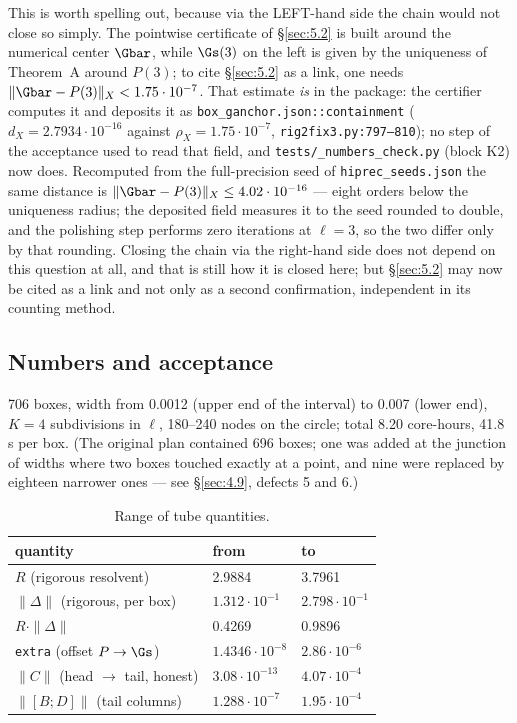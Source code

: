 This is worth spelling out, because via the LEFT-hand side the chain would
not close so simply. The pointwise certificate of \S\ref{sec:5.2} is built around the
numerical center $\Gbar$, while $\Gs(3)$ on the left is given by the uniqueness
of Theorem~A around $P(3)$; to cite \S\ref{sec:5.2} as a link, one needs
$\|\Gbar - P(3)\|_{X} < 1.75\cdot 10^{-7}$. That estimate \emph{is} in the package:
the certifier computes it and deposits it as
\texttt{box\_\allowbreak ganchor.json::\allowbreak containment}
($d_{X} = 2.7934\cdot 10^{-16}$ against $\rho_{X} = 1.75\cdot 10^{-7}$,
\texttt{rig2fix3.py:797--810}); no step of the acceptance used to read that
field, and \texttt{tests/\allowbreak \_\allowbreak numbers\_\allowbreak check.py}
(block K2) now does. Recomputed from the full-precision
seed of \texttt{hiprec\_seeds.json} the same distance is
$\|\Gbar - P(3)\|_{X} \le 4.02\cdot 10^{-16}$ --- eight orders below the
uniqueness radius; the deposited field measures it to the seed rounded to
double, and the polishing step performs zero iterations at $\ell = 3$, so the
two differ only by that rounding. Closing the chain via the right-hand side
does not depend on this question at all, and that is still how it is closed
here; but \S\ref{sec:5.2} may now be cited as a link and not only as a second
confirmation, independent in its counting method.



\subsection{Numbers and acceptance}\label{sec:4.8}

706 boxes, width from 0.0012 (upper end of the interval) to 0.007 (lower
end), $K = 4$ subdivisions in $\ell$, 180--240 nodes on the circle; total 8.20
core-hours, 41.8 s per box. (The original plan contained 696 boxes; one was
added at the junction of widths where two boxes touched exactly at a point,
and nine were replaced by eighteen narrower ones --- see \S\ref{sec:4.9}, defects 5 and
6.)

\begin{table}[h]
\centering
\caption{Range of tube quantities.}\label{tab:tube-quantities}
\begin{tabular}{lll}
\toprule
quantity & from & to \\
\midrule
$R$ (rigorous resolvent) & 2.9884 & 3.7961 \\
$\|\Delta\|$ (rigorous, per box) & $1.312\cdot 10^{-1}$ & $2.798\cdot 10^{-1}$ \\
$R\cdot \|\Delta\|$ & 0.4269 & 0.9896 \\
\texttt{extra} (offset $P \to \Gs$) & $1.4346\cdot 10^{-8}$ & $2.86\cdot 10^{-6}$ \\
$\|C\|$ (head $\to$ tail, honest) & $3.08\cdot 10^{-13}$ & $4.07\cdot 10^{-4}$ \\
$\|[B;D]\|$ (tail columns) & $1.288\cdot 10^{-7}$ & $1.95\cdot 10^{-4}$ \\
\bottomrule
\end{tabular}
\end{table}

